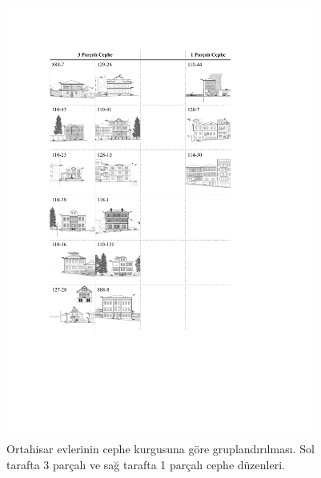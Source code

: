 \documentclass[12pt,turkish,a4paperpaper,]{report}
\begin{document}
\newpage

\begin{figure}
\centering
\includegraphics[width=0.9\textwidth,height=\textheight]{source/figures/cephegruplandirma.pdf}
\caption{Ortahisar evlerinin cephe kurgusuna göre gruplandırılması. Sol
tarafta 3 parçalı ve sağ tarafta 1 parçalı cephe düzenleri.
\label{cephegruplama}}
\end{figure}
\end{document}

